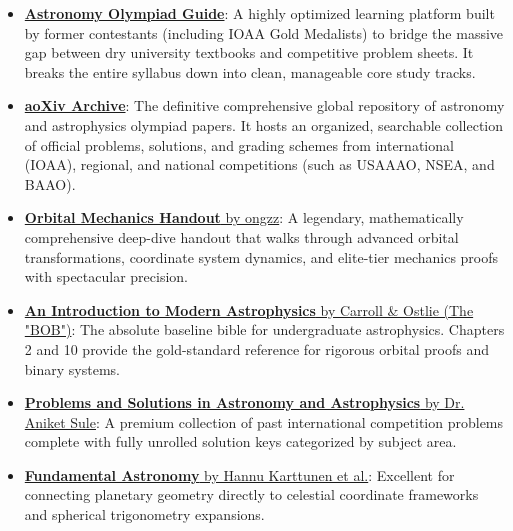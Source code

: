 \documentclass[11pt]{article}
\begin{document}
\begin{itemize}
    \item \href{https://aoguide.app}{\textbf{Astronomy Olympiad Guide}}: A highly optimized learning platform built by former contestants (including IOAA Gold Medalists) to bridge the massive gap between dry university textbooks and competitive problem sheets. It breaks the entire syllabus down into clean, manageable core study tracks.
    \item \href{https://aoguide.app}{\textbf{aoXiv Archive}}: The definitive comprehensive global repository of astronomy and astrophysics olympiad papers. It hosts an organized, searchable collection of official problems, solutions, and grading schemes from international (IOAA), regional, and national competitions (such as USAAAO, NSEA, and BAAO).
    \item \href{https://drive.google.com/file/d/1RM__5pGAsbDip_k_N2zqHnHW_xXBau_G/view}{\textbf{Orbital Mechanics Handout} by ongzz}: A legendary, mathematically comprehensive deep-dive handout that walks through advanced orbital transformations, coordinate system dynamics, and elite-tier mechanics proofs with spectacular precision.
    \item \href{https://drive.google.com/file/d/1V12rbls_OdmsxS4HSG2sudghqPZ54Wfz/view}{\textbf{An Introduction to Modern Astrophysics} by Carroll \& Ostlie (The "BOB")}: The absolute baseline bible for undergraduate astrophysics. Chapters 2 and 10 provide the gold-standard reference for rigorous orbital proofs and binary systems.
    \item \href{https://drive.google.com/file/d/1gFn2rYAE5QMrge7B0cz1x4K12mr2Ca1s/view}{\textbf{Problems and Solutions in Astronomy and Astrophysics} by Dr. Aniket Sule}: A premium collection of past international competition problems complete with fully unrolled solution keys categorized by subject area.
    \item \href{https://drive.google.com/file/d/1jAAtkF0YCrT3Fm9B4I2kxez393olF_iy/view}{\textbf{Fundamental Astronomy} by Hannu Karttunen et al.}: Excellent for connecting planetary geometry directly to celestial coordinate frameworks and spherical trigonometry expansions.
\end{itemize}
\end{document}
